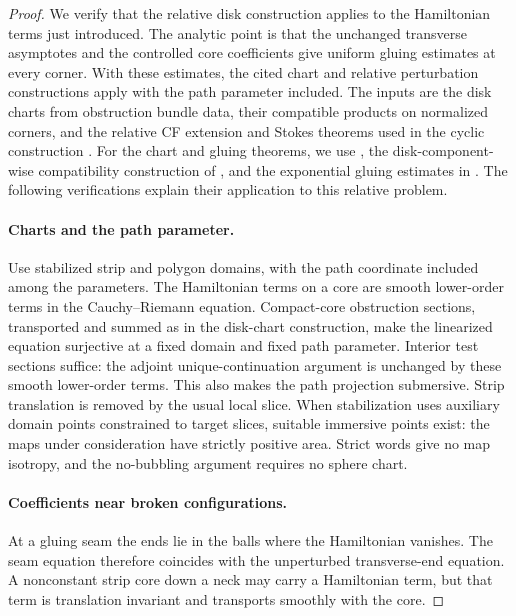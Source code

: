 \begin{proof}
We verify that the relative disk construction applies to the
Hamiltonian terms just introduced.  The analytic point is that the
unchanged transverse asymptotes and the controlled core coefficients
give uniform gluing estimates at every corner.  With these estimates,
the cited chart and relative perturbation constructions apply with
the path parameter included.  The inputs are the disk charts
from obstruction bundle data, their compatible products on normalized
corners, and the relative CF extension and Stokes theorems used in
the cyclic construction
\cite[Sections~9--10 and~12]{AFOOO2026}.  For the chart and gluing
theorems, we use \cite[Theorem~7.1, Condition~7.11, and
Lemma~7.12]{FOOOChartsI}, the disk-component-wise compatibility
construction of \cite{FOOOChartsII}, and the exponential gluing
estimates in \cite[Assumption~3.12 and Theorems~3.13, 6.4,
8.16--8.17]{FOOOGluing}.  The following verifications explain their
application to this relative problem.

\paragraph{Charts and the path parameter.}
Use stabilized strip and polygon domains, with the path coordinate
included among the parameters.  The Hamiltonian terms on a core are
smooth lower-order terms in the Cauchy--Riemann equation.  Compact-core
obstruction sections, transported and summed as in the disk-chart
construction, make the linearized equation surjective at a fixed
domain and fixed path parameter.  Interior test sections suffice:
the adjoint unique-continuation argument is unchanged by these
smooth lower-order terms.  This also makes the path projection
submersive.  Strip translation is removed by the usual local slice.
When stabilization uses auxiliary domain points constrained to
target slices, suitable immersive points exist: the maps under
consideration have strictly positive area.  Strict words give no
map isotropy, and the no-bubbling argument requires no sphere chart.

\paragraph{Coefficients near broken configurations.}
At a gluing seam the ends lie in the balls where the Hamiltonian
vanishes.  The seam equation therefore coincides with the
unperturbed transverse-end equation.  A nonconstant strip core down
a neck may carry a Hamiltonian term, but that term is translation
invariant and transports smoothly with the core.


\end{proof}
